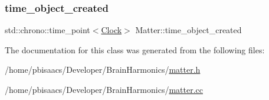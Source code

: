\mbox{\label{classMatter_abce05beb1ad51f3b4bddefcd35731a2f}} 
\subsubsection{\texorpdfstring{time\+\_\+object\+\_\+created}{time\_object\_created}}
{\footnotesize\ttfamily std\+::chrono\+::time\+\_\+point$<$\mbox{\hyperlink{universe_8h_a0ef8d951d1ca5ab3cfaf7ab4c7a6fd80}{Clock}}$>$ Matter\+::time\+\_\+object\+\_\+created\hspace{0.3cm}{\ttfamily [private]}}



The documentation for this class was generated from the following files\+:\begin{DoxyCompactItemize}
\item 
/home/pbisaacs/\+Developer/\+Brain\+Harmonics/\mbox{\hyperlink{matter_8h}{matter.\+h}}\item 
/home/pbisaacs/\+Developer/\+Brain\+Harmonics/\mbox{\hyperlink{matter_8cc}{matter.\+cc}}\end{DoxyCompactItemize}
